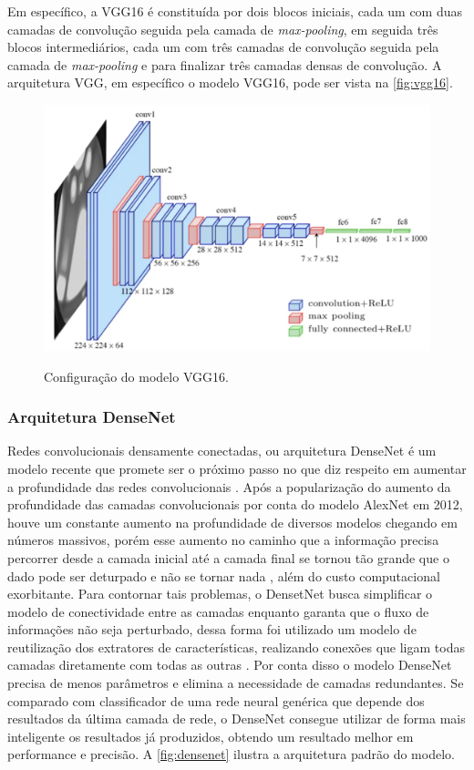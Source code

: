 Em específico, a VGG16 é constituída por dois blocos iniciais, cada um com duas camadas de convolução seguida pela camada de \textit{max-pooling}, em seguida três blocos intermediários, cada um com três camadas de convolução seguida pela camada de \textit{max-pooling} e para finalizar três camadas densas de convolução.
A arquitetura VGG, em específico o modelo VGG16, pode ser vista na \autoref{fig:vgg16}.

\begin{figure}[htb]
    \centering
    \caption{Configuração do modelo VGG16.}
    \includegraphics[width=0.8\linewidth]{images/vgg16.jpg}
    \label{fig:vgg16}
\end{figure}



\subsubsection{Arquitetura DenseNet}

Redes convolucionais densamente conectadas, ou arquitetura DenseNet \cite{huang2017densely} é um modelo recente que promete ser o próximo passo no que diz respeito em aumentar a profundidade das redes convolucionais \cite{PabloDenseNet2018}. 
Após a popularização do aumento da profundidade das camadas convolucionais por conta do modelo AlexNet \cite{krizhevsky2017imagenet} em 2012, houve um constante aumento na profundidade de diversos modelos chegando em números massivos, porém esse aumento no caminho que a informação precisa percorrer desde a camada inicial até a camada final se tornou tão grande que o dado pode ser deturpado e não se tornar nada \cite{PabloDenseNet2018}, além do custo computacional exorbitante. 
Para contornar tais problemas, o DensetNet busca simplificar o modelo de conectividade entre as camadas enquanto garanta que o fluxo de informações não seja perturbado, dessa forma foi utilizado um modelo de reutilização dos extratores de características, realizando conexões que ligam todas camadas diretamente com todas as outras \cite{huang2017densely}. 
Por conta disso o modelo DenseNet precisa de menos parâmetros e elimina a necessidade de camadas redundantes. Se comparado com classificador de uma rede neural genérica que depende dos resultados da última camada de rede, o DenseNet consegue utilizar de forma mais inteligente os resultados já produzidos, obtendo um resultado melhor em performance e precisão.
A \autoref{fig:densenet} ilustra a arquitetura padrão do modelo.

